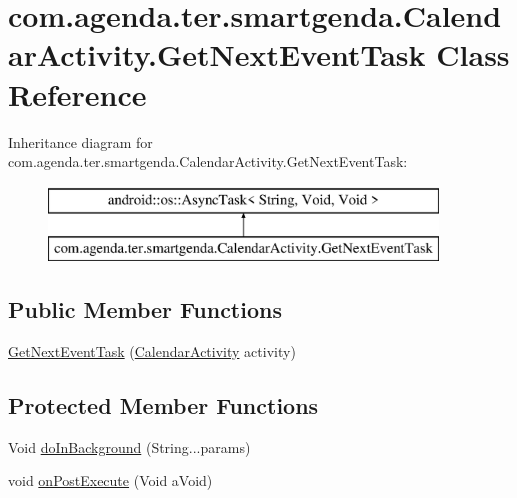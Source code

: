 \hypertarget{classcom_1_1agenda_1_1ter_1_1smartgenda_1_1_calendar_activity_1_1_get_next_event_task}{\section{com.\-agenda.\-ter.\-smartgenda.\-Calendar\-Activity.\-Get\-Next\-Event\-Task Class Reference}
\label{classcom_1_1agenda_1_1ter_1_1smartgenda_1_1_calendar_activity_1_1_get_next_event_task}
}
Inheritance diagram for com.\-agenda.\-ter.\-smartgenda.\-Calendar\-Activity.\-Get\-Next\-Event\-Task\-:\begin{figure}[H]
\begin{center}
\leavevmode
\includegraphics[height=2.000000cm]{classcom_1_1agenda_1_1ter_1_1smartgenda_1_1_calendar_activity_1_1_get_next_event_task}
\end{center}
\end{figure}
\subsection*{Public Member Functions}
\begin{DoxyCompactItemize}
\item 
\hyperlink{classcom_1_1agenda_1_1ter_1_1smartgenda_1_1_calendar_activity_1_1_get_next_event_task_aa6b5f4dbdaaf2277937a37959b51ed56}{Get\-Next\-Event\-Task} (\hyperlink{classcom_1_1agenda_1_1ter_1_1smartgenda_1_1_calendar_activity}{Calendar\-Activity} activity)
\end{DoxyCompactItemize}
\subsection*{Protected Member Functions}
\begin{DoxyCompactItemize}
\item 
Void \hyperlink{classcom_1_1agenda_1_1ter_1_1smartgenda_1_1_calendar_activity_1_1_get_next_event_task_a0de6af7b4d343acae4c0a969f554fa3f}{do\-In\-Background} (String...\-params)
\item 
void \hyperlink{classcom_1_1agenda_1_1ter_1_1smartgenda_1_1_calendar_activity_1_1_get_next_event_task_a38780460c9de3c247eabf47694c3dbe7}{on\-Post\-Execute} (Void a\-Void)
\end{DoxyCompactItemize}


